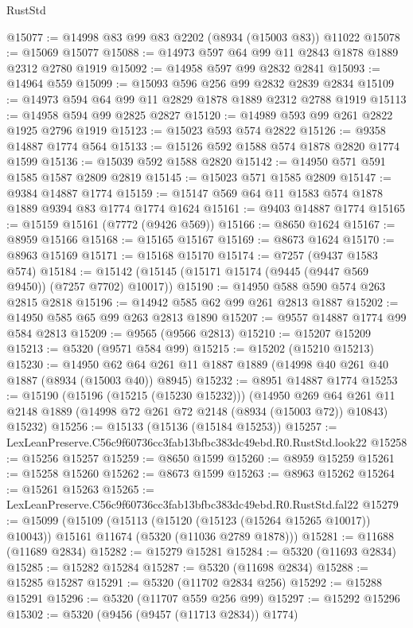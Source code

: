 \begin{lexlean}{RustStd}
\begin{coremodule}
@15077 := @14998 @83 @99 @83 @2202 (@8934 (@15003 @83)) @11022
@15078 := @15069 @15077
@15088 := @14973 @597 @64 @99 @11 @2843 @1878 @1889 @2312 @2780 @1919
@15092 := @14958 @597 @99 @2832 @2841
@15093 := @14964 @559
@15099 := @15093 @596 @256 @99 @2832 @2839 @2834
@15109 := @14973 @594 @64 @99 @11 @2829 @1878 @1889 @2312 @2788 @1919
@15113 := @14958 @594 @99 @2825 @2827
@15120 := @14989 @593 @99 @261 @2822 @1925 @2796 @1919
@15123 := @15023 @593 @574 @2822
@15126 := @9358 @14887 @1774 @564
@15133 := @15126 @592 @1588 @574 @1878 @2820 @1774 @1599
@15136 := @15039 @592 @1588 @2820
@15142 := @14950 @571 @591 @1585 @1587 @2809 @2819
@15145 := @15023 @571 @1585 @2809
@15147 := @9384 @14887 @1774
@15159 := @15147 @569 @64 @11 @1583 @574 @1878 @1889 @9394 @83 @1774 @1774 @1624
@15161 := @9403 @14887 @1774
@15165 := @15159 @15161 (@7772 (@9426 @569))
@15166 := @8650 @1624
@15167 := @8959 @15166
@15168 := @15165 @15167
@15169 := @8673 @1624
@15170 := @8963 @15169
@15171 := @15168 @15170
@15174 := @7257 (@9437 @1583 @574)
@15184 := @15142 (@15145 (@15171 @15174 (@9445 (@9447 @569 @9450)) (@7257 @7702) @10017))
@15190 := @14950 @588 @590 @574 @263 @2815 @2818
@15196 := @14942 @585 @62 @99 @261 @2813 @1887
@15202 := @14950 @585 @65 @99 @263 @2813 @1890
@15207 := @9557 @14887 @1774 @99 @584 @2813
@15209 := @9565 (@9566 @2813)
@15210 := @15207 @15209
@15213 := @5320 (@9571 @584 @99)
@15215 := @15202 (@15210 @15213)
@15230 := @14950 @62 @64 @261 @11 @1887 @1889 (@14998 @40 @261 @40 @1887 (@8934 (@15003 @40)) @8945)
@15232 := @8951 @14887 @1774
@15253 := @15190
    (@15196 (@15215 (@15230 @15232)))
    (@14950
      @269
      @64
      @261
      @11
      @2148
      @1889
      (@14998 @72 @261 @72 @2148 (@8934 (@15003 @72)) @10843)
      @15232)
@15256 := @15133 (@15136 (@15184 @15253))
@15257 := LexLeanPreserve.C56c9f60736cc3fab13bfbc383dc49ebd.R0.RustStd.look22
@15258 := @15256 @15257
@15259 := @8650 @1599
@15260 := @8959 @15259
@15261 := @15258 @15260
@15262 := @8673 @1599
@15263 := @8963 @15262
@15264 := @15261 @15263
@15265 := LexLeanPreserve.C56c9f60736cc3fab13bfbc383dc49ebd.R0.RustStd.fal22
@15279 := @15099
    (@15109
      (@15113 (@15120 (@15123 (@15264 @15265 @10017)) @10043))
      @15161
      @11674
      (@5320 (@11036 @2789 @1878)))
@15281 := @11688 (@11689 @2834)
@15282 := @15279 @15281
@15284 := @5320 (@11693 @2834)
@15285 := @15282 @15284
@15287 := @5320 (@11698 @2834)
@15288 := @15285 @15287
@15291 := @5320 (@11702 @2834 @256)
@15292 := @15288 @15291
@15296 := @5320 (@11707 @559 @256 @99)
@15297 := @15292 @15296
@15302 := @5320 (@9456 (@9457 (@11713 @2834)) @1774)

\end{coremodule}
\end{lexlean}
